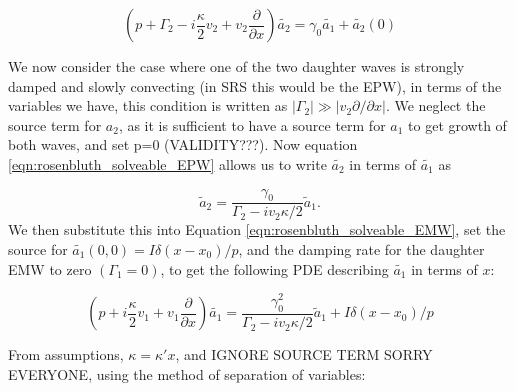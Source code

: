 \begin{equation}\label{eqn:rosenbluth_solveable_EPW}
	\left(p + \Gamma_2 - i\frac{\kappa}{2}v_2 + v_2\frac{\partial}{\partial x}\right)\tilde{a_2} = \gamma_0 \tilde{a_1} + \tilde{a_2}(0)
\end{equation}  

We now consider the case where one of the two daughter waves is strongly damped and slowly convecting (in SRS this would be the EPW), in terms of the variables we have, this condition is written as $|\Gamma_2| \gg |v_2\partial / \partial x|$. We neglect the source term for $a_2$, as it is sufficient to have a source term for $a_1$ to get growth of both waves, and set p=0 (VALIDITY???). Now equation \ref{eqn:rosenbluth_solveable_EPW} allows us to write $\tilde{a_2}$ in terms of $\tilde{a_1}$ as

\begin{equation}
	\tilde{a}_2 = \frac{\gamma_0}{\Gamma_2 - i v_2 \kappa/2}\tilde{a}_1.
\end{equation} We then substitute this into Equation \ref{eqn:rosenbluth_solveable_EMW}, set the source for $\tilde{a_1}(0,0) = I\delta(x-x_0)/p$, and the damping rate for the daughter EMW to zero $(\Gamma_1=0)$, to get the following PDE describing $\tilde{a_1}$ in terms of $x$:

\begin{equation}
	\left(p + i\frac{\kappa}{2}v_1 + v_1\frac{\partial}{\partial x}\right)\tilde{a_1} = \frac{\gamma_0^2}{\Gamma_2 - i v_2 \kappa/2}\tilde{a}_1 + I\delta(x-x_0)/p
\end{equation}

From assumptions, $\kappa = \kappa' x$, and IGNORE SOURCE TERM SORRY EVERYONE, using the method of separation of variables:
